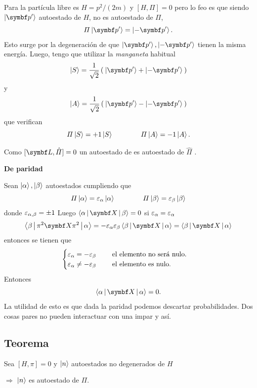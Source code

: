 \documentclass[10pt,oneside]{CBFT_book}
\begin{document}
Para la partícula libre es $H = p^2/(2m)$ y $[H,\Pi] = 0$ pero lo feo es que siendo $\Ket{\vb p'}$ autoestado
de $H$, no es autoestado de $\Pi$,
\[
	\Pi \Ket{\vb p'} = \Ket{-\vb p'}.
\]
Esto surge por la degeneración de que $\Ket{\vb p'}, \Ket{-\vb p'}$ tienen la misma energía.
Luego, tengo que utilizar la {\it manganeta} habitual
\[
	\Ket{S} = \frac{1}{\sqrt{2}} \left( \: \Ket{\vb p'} + \Ket{-\vb p'} \: \right)
\]
y
\[
	\Ket{A} = \frac{1}{\sqrt{2}} \left( \: \Ket{\vb p'} - \Ket{-\vb p'} \: \right)
\]
que verifican
\[
	\Pi \Ket{S} = +1 \Ket{S} \qquad \qquad \Pi \Ket{A} = -1 \Ket{A}.
\]

Como $[\vb{L},\hat{\Pi}]=0$ un autoestado de  es autoestado de $\hat{\Pi}$ .

\begin{ejemplo}{\bf De paridad}

Sean $\Ket{\alpha}, \Ket{\beta}$ autoestados cumpliendo que
\[
	\Pi \Ket{\alpha} = \varepsilon_\alpha \Ket{\alpha} \qquad \qquad 
	\Pi \Ket{\beta} = \varepsilon_\beta \Ket{\beta}
\]
donde $\varepsilon_{\alpha,\beta} = \pm 1$
Luego $ \Braket{\a|\vb X|\b} = 0 $ si $\varepsilon_\alpha = \varepsilon_\alpha$
\[
	\Braket{ \b | \pi^2 \vb X \pi^2 | \a } = - \varepsilon_\a \varepsilon_\b 
	\Braket{ \b | \vb X | \a } = \Braket{ \b | \vb X | \a}
\]
entonces se tienen que 
\[
	\begin{cases}
		\varepsilon_\alpha = - \varepsilon_\beta \qquad \text{ el elemento no será nulo.} \\
		\varepsilon_\alpha \neq - \varepsilon_\beta \qquad \text{ el elemento es nulo.}
	\end{cases}
\]
Entonces
\[
	\Braket{\a|\vb X|\a} = 0.
\]
La utilidad de esto es que dada la paridad podemos descartar probabilidades. 
Dos cosas pares no pueden interactuar con una impar y así.
 
\end{ejemplo}


\subsection{Teorema}

Sea $[H,\pi]=0$ y $\Ket{n}$ autoestados no degenerados de $H$ 

	$\Rightarrow$ $\Ket{n}$ es autoestado de $\Pi$.
\end{document}
